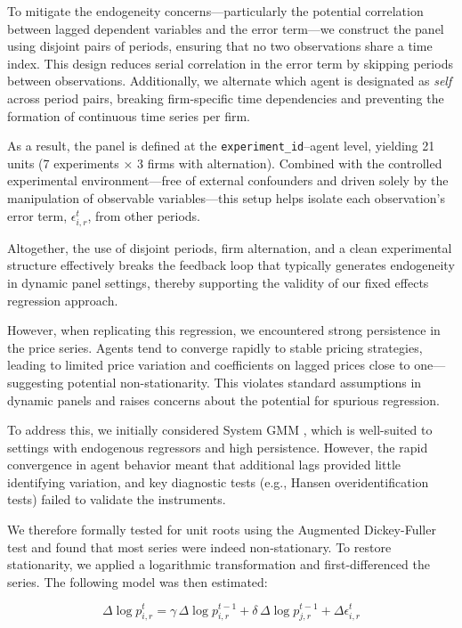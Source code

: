 To mitigate the endogeneity concerns---particularly the potential correlation between lagged dependent variables and the error term---we construct the panel using disjoint pairs of periods, ensuring that no two observations share a time index. This design reduces serial correlation in the error term by skipping periods between observations. Additionally, we alternate which agent is designated as \textit{self} across period pairs, breaking firm-specific time dependencies and preventing the formation of continuous time series per firm.

As a result, the panel is defined at the \texttt{experiment\_id}–agent level, yielding 21 units (7 experiments × 3 firms with alternation). Combined with the controlled experimental environment---free of external confounders and driven solely by the manipulation of observable variables---this setup helps isolate each observation’s error term, $\epsilon_{i,r}^t$, from other periods.

Altogether, the use of disjoint periods, firm alternation, and a clean experimental structure effectively breaks the feedback loop that typically generates endogeneity in dynamic panel settings, thereby supporting the validity of our fixed effects regression approach.

However, when replicating this regression, we encountered strong persistence in the price series. Agents tend to converge rapidly to stable pricing strategies, leading to limited price variation and coefficients on lagged prices close to one---suggesting potential non-stationarity. This violates standard assumptions in dynamic panels and raises concerns about the potential for spurious regression.

To address this, we initially considered System GMM \parencite{blundell_initial_1998}, which is well-suited to settings with endogenous regressors and high persistence. However, the rapid convergence in agent behavior meant that additional lags provided little identifying variation, and key diagnostic tests (e.g., Hansen overidentification tests) failed to validate the instruments.

We therefore formally tested for unit roots using the Augmented Dickey-Fuller test and found that most series were indeed non-stationary. To restore stationarity, we applied a logarithmic transformation and first-differenced the series. The following model was then estimated:

\begin{equation}
    \Delta \log p_{i,r}^{t} = \gamma \, \Delta \log p_{i,r}^{t-1} + \delta \, \Delta \log p_{j,r}^{t-1} + \Delta \epsilon_{i,r}^t
\end{equation}

